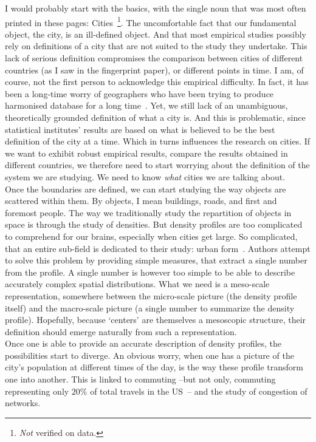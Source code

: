I would probably start with the basics, with the single noun that was most often
printed in these pages: Cities~\footnote{\emph{Not} verified on data.}. The
uncomfortable fact that our fundamental object, the city, is an ill-defined
object. And that most empirical studies possibly rely on definitions of a city
that are not suited to the study they undertake.  This lack of serious
definition compromises the comparison between cities of different countries (as
I saw in the fingerprint paper), or different points in time. I am, of course,
not the first person to acknowledge this empirical difficulty. In fact, it has
been a long-time worry of geographers who have been trying to produce harmonised
database for a long time~\cite{Pumain:2015}. Yet, we still lack of an
unambiguous, theoretically grounded definition of what a city is. And this is
problematic, since statistical institutes' results are based on what is believed
to be the best definition of the city at a time. Which in turns influences the
research on cities. If we want to exhibit robust empirical results, compare the
results obtained in different countries, we therefore need to start worrying
about the definition of the system we are studying. We need to know \emph{what}
cities we are talking about.\\


Once the boundaries are defined, we can start studying the way objects are
scattered within them. By objects, I mean buildings, roads, and first and
foremost people. The way we traditionally study the repartition of objects in
space is through the study of densities. But density profiles are too
complicated to comprehend for our brains, especially when cities get large. So
complicated, that an entire sub-field is dedicated to their study: urban
form~\cite{Tsai:2005,Schwarz:2010,LeNechet:2015}.
Authors attempt to solve this problem by providing simple measures,
that extract a single number from the profile. A single number is however too
simple to be able to describe accurately complex spatial distributions. What we need
is a meso-scale representation, somewhere between the micro-scale picture (the
density profile itself) and the macro-scale picture (a single number to
summarize the density profile). Hopefully, because `centers' are themselves a
mesoscopic structure, their definition should emerge naturally from such a
representation.\\


Once one is able to provide an accurate description of density profiles, the
possibilities start to diverge. An obvious worry, when one has a picture of the
city's population at different times of the day, is the way these profile
transform one into another. This is linked to commuting --but not only,
commuting representing only $20\%$ of total travels in the
US~\cite{FHWA-PL-11-022}-- and the study of congestion of networks. 

